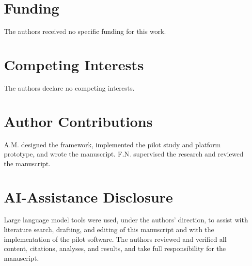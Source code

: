\documentclass[journal]{IEEEtran}
\begin{document}
\section*{Funding}
The authors received no specific funding for this work.

\section*{Competing Interests}
The authors declare no competing interests.

\section*{Author Contributions}
A.M. designed the framework, implemented the pilot study and platform
prototype, and wrote the manuscript. F.N. supervised the research and
reviewed the manuscript.

\section*{AI-Assistance Disclosure}
Large language model tools were used, under the authors' direction, to
assist with literature search, drafting, and editing of this manuscript
and with the implementation of the pilot software. The authors reviewed
and verified all content, citations, analyses, and results, and take full
responsibility for the manuscript.



\end{document}
